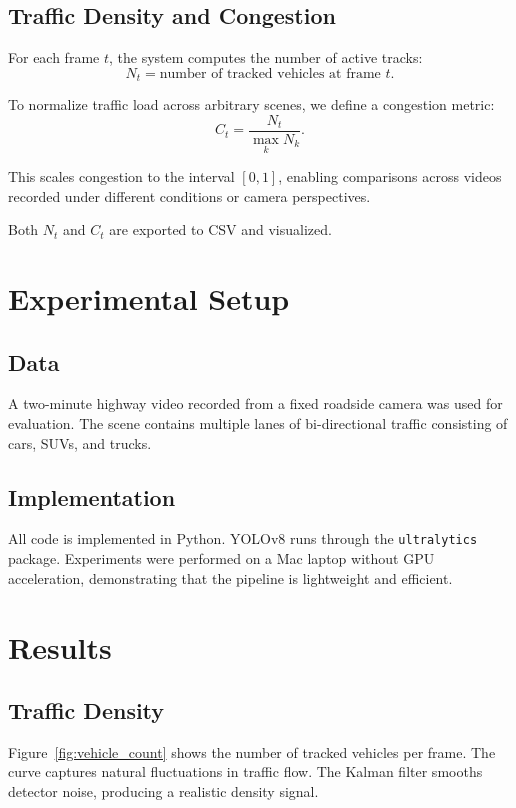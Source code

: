 \documentclass[12pt]{article}
\begin{document}
\subsection{Traffic Density and Congestion}
For each frame $t$, the system computes the number of active tracks:
\[
N_t = \text{number of tracked vehicles at frame } t.
\]

To normalize traffic load across arbitrary scenes, we define a congestion metric:
\[
C_t = \frac{N_t}{\max_k N_k}.
\]

This scales congestion to the interval $[0,1]$, enabling comparisons across videos recorded under different conditions or camera perspectives.

Both $N_t$ and $C_t$ are exported to CSV and visualized.

\section{Experimental Setup}

\subsection{Data}
A two-minute highway video recorded from a fixed roadside camera was used for evaluation. The scene contains multiple lanes of bi-directional traffic consisting of cars, SUVs, and trucks.

\subsection{Implementation}
All code is implemented in Python. YOLOv8 runs through the \texttt{ultralytics} package. Experiments were performed on a Mac laptop without GPU acceleration, demonstrating that the pipeline is lightweight and efficient.

\section{Results}

\subsection{Traffic Density}
Figure~\ref{fig:vehicle_count} shows the number of tracked vehicles per frame. The curve captures natural fluctuations in traffic flow. The Kalman filter smooths detector noise, producing a realistic density signal.
\end{document}
